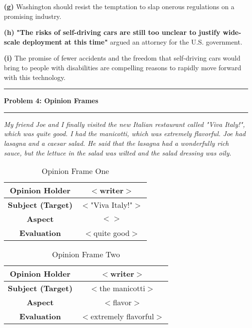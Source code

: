 \documentclass[11pt]{article}
\newcommand\question[2]{\vspace{.25in}\hrule\textbf{#1: #2}\vspace{.5em}\hrule\vspace{.10in}}
\renewcommand\part[1]{\vspace{.10in}\textbf{(#1)}}
\begin{document}
\part{g} Washington should resist the temptation to slap onerous regulations on a promising industry.


\part{h} \textbf{"The risks of self-driving cars are still too unclear to justify wide-scale deployment at this time"} argued an attorney for the U.S. government.


\part{i} The promise of fewer accidents and the freedom that self-driving cars would bring to people with disabilities are compelling reasons to rapidly move forward with this technology.


\question{Problem 4}{Opinion Frames}

\textit{My friend Joe and I finally visited the new Italian restaurant called "Viva Italy!", which was quite good. I had the manicotti, which was extremely flavorful. Joe had lasagna and a caesar salad. He said that the lasagna had a wonderfully rich sauce, but the lettuce in the salad was wilted and the salad dressing was oily.}

 \begin{table}[H]
\centering
{\renewcommand{\arraystretch}{1.2}%
\begin{tabular}{| c | c |}
\hline
\textbf{Opinion Holder} & $<$writer$>$\\ \hline
\textbf{Subject (Target)} & $<$"Viva Italy!"$>$ \\ \hline
\textbf{Aspect} & $<$$>$ \\ \hline
\textbf{Evaluation} & $<$quite good$>$ \\ \hline
\end{tabular}}
\caption{Opinion Frame One}
\end{table}

 \begin{table}[H]
\centering
{\renewcommand{\arraystretch}{1.2}%
\begin{tabular}{| c | c |}
\hline
\textbf{Opinion Holder} & $<$writer$>$\\ \hline
\textbf{Subject (Target)} & $<$the manicotti$>$ \\ \hline
\textbf{Aspect} & $<$flavor$>$ \\ \hline
\textbf{Evaluation} & $<$extremely flavorful$>$ \\ \hline
\end{tabular}}
\caption{Opinion Frame Two}
\end{table}
\end{document}
